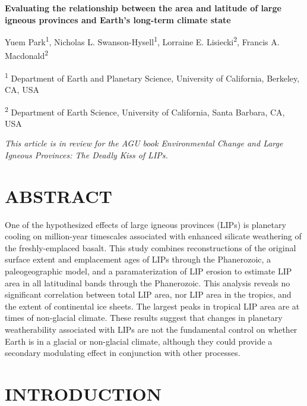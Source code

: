\documentclass[11pt,letterpaper]{article}
\begin{document}
\begin{flushleft}
{\Large \textbf{Evaluating the relationship between the area and latitude of large igneous provinces and Earth's long-term climate state}}

Yuem Park\textsuperscript{1},
Nicholas L. Swanson-Hysell\textsuperscript{1},
Lorraine E. Lisiecki\textsuperscript{2},
Francis A. Macdonald\textsuperscript{2}

\bigskip
\textsuperscript{1} Department of Earth and Planetary Science, University of California, Berkeley, CA, USA

\textsuperscript{2} Department of Earth Science, University of California, Santa Barbara, CA, USA
\bigskip

\end{flushleft}

\noindent\textit{This article is in review for the AGU book \textit{Environmental Change and Large Igneous Provinces: The Deadly Kiss of LIPs}.}

\linenumbers

\section*{ABSTRACT \label{sec:ABSTRACT}}

One of the hypothesized effects of large igneous provinces (LIPs) is planetary cooling on million-year timescales associated with enhanced silicate weathering of the freshly-emplaced basalt. This study combines reconstructions of the original surface extent and emplacement ages of LIPs through the Phanerozoic, a paleogeographic model, and a paramaterization of LIP erosion to estimate LIP area in all latitudinal bands through the Phanerozoic. This analysis reveals no significant correlation between total LIP area, nor LIP area in the tropics, and the extent of continental ice sheets. The largest peaks in tropical LIP area are at times of non-glacial climate. These results suggest that changes in planetary weatherability associated with LIPs are not the fundamental control on whether Earth is in a glacial or non-glacial climate, although they could provide a secondary modulating effect in conjunction with other processes.

\section*{INTRODUCTION \label{sec:INTRODUCTION}}
\end{document}
